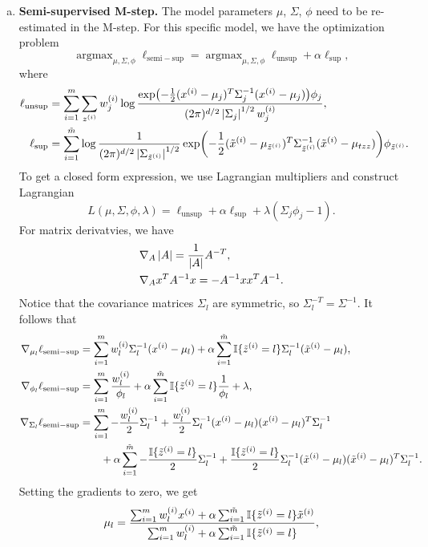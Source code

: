 \documentclass[12pt,letterpaper,boxed]{hmcpset}
\newcommand{\ww}{w^{(i)}}
\newcommand{\ind}[1]{\mathbb{I}\{#1\}}
\DeclareMathOperator*{\argmax}{argmax}
\newcommand{\lunsup}{\ell_{\mathrm{unsup}}}
\newcommand{\lsup}{\ell_{\mathrm{sup}}}
\newcommand{\lsemi}{\ell_{\mathrm{semi-sup}}}
\begin{document}
\begin{solution}
\begin{enumerate}[(a)]
    \item \textbf{Semi-supervised M-step.} The model parameters $\mu$, $\Sigma$, $\phi$ need to be re-estimated in the M-step. For this specific model, we have the optimization problem
    \[
    \argmax_{\mu, \Sigma, \phi} \lsemi = \argmax_{\mu, \Sigma, \phi} \lunsup + \alpha \lsup, 
    \]
    where
    \[
    \begin{aligned}
      \lunsup &= \sum_{i=1}^m \sum_{\zz} \ww_j \log \frac{\exp(-\frac{1}{2} (\xx - \mu_j)^T \Sigma_j^{-1} (\xx - \mu_j)) \phi_j}{(2\pi)^{d/2} \abs{\Sigma_j}^{1/2} \ww_j}, \\
      \lsup &= \sum_{i=1}^{\tilde{m}} \log \frac{1}{(2\pi)^{d/2} \abs{\Sigma_{\tzz}}^{1/2}} \exp(-\frac{1}{2} (\txx - \mu_{\tzz})^T \Sigma_{\tzz}^{-1} (\txx - \mu_{tzz})) \phi_{\tzz}.
    \end{aligned}
    \]
    To get a closed form expression, we use Lagrangian multipliers and construct Lagrangian
    \[
    L(\mu, \Sigma, \phi, \lambda) = \lunsup + \alpha \lsup + \lambda (\Sigma_j \phi_j - 1).
    \]
    For matrix derivatvies, we have
    \[
    \begin{aligned}
      &\nabla_A \left\lvert A\right\rvert = \frac{1}{\left\lvert A\right\rvert} A^{-T}, \\
      &\nabla_A x^T A^{-1} x = - A^{-1} x x^T A^{-1}.
    \end{aligned}
    \]
    Notice that the covariance matrices $\Sigma_l$ are symmetric, so $\Sigma_l^{-T} = \Sigma^{-1}$. It follows that
    \[
    \begin{aligned}
      \nabla_{\mu_l} \lsemi &= \sum_{i=1}^{m} \ww_l \Sigma_l^{-1} (\xx - \mu_l) + \alpha \sum_{i=1}^{\tilde{m}} \ind{\tzz = l} \Sigma_l^{-1} (\txx - \mu_l), \\
      \nabla_{\phi_l} \lsemi &=  \sum_{i=1}^m \frac{\ww_l}{\phi_l} + \alpha \sum_{i=1}^{\tilde{m}} \ind{\tzz = l} \frac{1}{\phi_l} + \lambda, \\
      \nabla_{\Sigma_l} \lsemi &= \sum_{i=1}^m -\frac{\ww_l}{2}\Sigma_l^{-1} + \frac{\ww_l}{2} \Sigma_l^{-1} (\xx - \mu_l)(\xx - \mu_l)^T \Sigma_l^{-1} \\
      & \qquad + \alpha \sum_{i=1}^{\tilde{m}} - \frac{\ind{\tzz = l} }{2}\Sigma_l^{-1} + \frac{\ind{\tzz = l } }{2} \Sigma_l^{-1} (\txx - \mu_l)(\txx - \mu_l)^T \Sigma_l^{-1}.
    \end{aligned}
    \]
    Setting the gradients to zero, we get
    \[
    \begin{aligned}
      \mu_l &= \frac{\sum_{i=1}^m \ww_l \xx + \alpha \sum_{i=1}^{\tilde{m}} \ind{\tzz = l} \txx}{\sum_{i=1}^m \ww_l + \alpha \sum_{i=1}^{\tilde{m}} \ind{\tzz = l}}, \\

\end{aligned}\]
\end{enumerate}
\end{solution}
\end{document}
